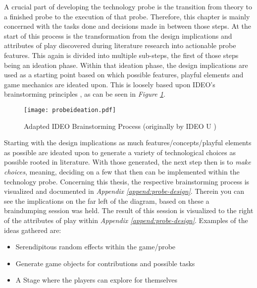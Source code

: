 A crucial part of developing the technology probe is the transition from theory to a finished probe to the execution of that probe. Therefore, this chapter is mainly concerned with the tasks done and decisions made in between those steps. At the start of this process is the transformation from the design implications and attributes of play discovered during literature research into actionable probe features. This again is divided into multiple sub-steps, the first of those steps being an ideation phase. Within that ideation phase, the design implications are used as a starting point based on which possible features, playful elements and game mechanics are ideated upon. This is loosely based upon IDEO's brainstorming principles \cite{ideo2021brainstorming}, as can be seen in \textit{Figure \ref{fig:probeideation}}.

\begin{figure}[h]
  \centering
  \texttt{[image: probeideation.pdf]}
  \caption{Adapted IDEO Brainstorming Process (originally by IDEO U \cite{ideo2021brainstorming})}
  \label{fig:probeideation}
\end{figure}

Starting with the design implications as much features/concepts/playful elements as possible are ideated upon to generate a variety of technological choices as possible rooted in literature. With those generated, the next step then is to \textit{make choices}, meaning, deciding on a few that then can be implemented within the technology probe. Concerning this thesis, the respective brainstorming process is visualized and documented in \textit{Appendix \ref{append:probe-design}}. Therein you can see the implications on the far left of the diagram, based on these a braindumping session \cite{ia2021dumping} was held. The result of this session is visualized to the right of the attributes of play within \textit{Appendix \ref{append:probe-design}}. Examples of the ideas gathered are:

\begin{itemize}
  \item{Serendipitous random effects within the game/probe}
  \item{Generate game objects for contributions and possible tasks}
  \item{A Stage where the players can explore for themselves}
\end{itemize}

